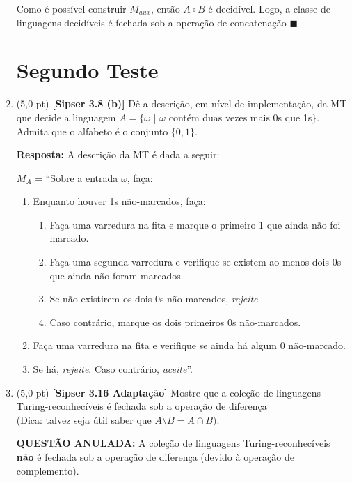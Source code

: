 \documentclass[12pt,a4paper,oneside]{article}
\begin{document}
\begin{enumerate}
{		Como é possível construir $M_{aux}$, então $A \circ B$ é decidível. Logo, a classe de linguagens decidíveis é fechada sob a operação de concatenação $\blacksquare$
	}

	\newpage
	
	\section*{Segundo Teste}
	
	\item (5,0 pt)  {\bf [Sipser 3.8 (b)]} Dê a descrição, em nível de implementação, da MT que decide a linguagem $A = \{\omega$ | $\omega$ contém duas vezes mais 0s que 1s$\}$. Admita que o alfabeto é o conjunto $\{0,1\}$.
	
	\vspace*{0.1cm}
	
	{\color{blue} {\bf Resposta:} A descrição da MT é dada a seguir:
		
		$M_{A}$ = ``Sobre a entrada $\omega$, faça:
		\begin{enumerate}
			\item Enquanto houver 1s não-marcados, faça:
			\begin{enumerate}
				\item Faça uma varredura na fita e marque o primeiro 1 que ainda não foi marcado.
				\item Faça uma segunda varredura e verifique se existem ao menos dois 0s que ainda não foram marcados.
				\item Se não existirem os dois 0s não-marcados, {\it rejeite}.
				\item Caso contrário, marque os dois primeiros 0s não-marcados.
			\end{enumerate}
			\item Faça uma varredura na fita e verifique se ainda há algum 0 não-marcado.
			\item Se há, {\it rejeite}. Caso contrário, {\it aceite}''.
		\end{enumerate}
		
	}

	\item (5,0 pt) {\bf [Sipser 3.16 Adaptação]} Mostre que a coleção de linguagens Turing-reconhecíveis é fechada sob a operação de diferença \\(Dica: talvez seja útil saber que $A \setminus B = A \cap \overline{B})$.
	
	\vspace{0.3cm}
	
	{\color{blue} 
		{\bf QUESTÃO ANULADA:} A coleção de linguagens Turing-reconhecíveis {\bf não} é fechada sob a operação de diferença (devido à operação de complemento). 
	}
	
	

\end{enumerate}
\end{document}
